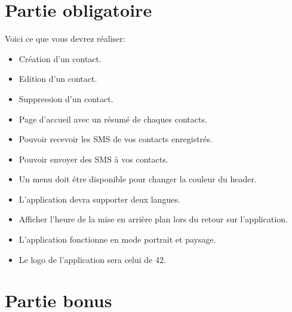\documentclass{42}
\begin{document}
\chapter{Partie obligatoire}
	
	Voici ce que vous devrez r\'ealiser:\\
	\vspace{5mm}
	\begin{itemize}\itemsep6pt
		\item Cr\'eation d'un contact.
		\item Edition d'un contact.
		\item Suppression d'un contact.
		\item Page d'accueil avec un r\'esum\'e de chaques contacts.
		\item Pouvoir recevoir les SMS de vos contacts enregistr\'es.
		\item Pouvoir envoyer des SMS \`a vos contacts.
		\item Un menu doit \'etre disponible pour changer la couleur du header.
		\item L'application devra supporter deux langues.
		\item Afficher l'heure de la mise en arri\`ere plan lors du retour sur
		l'application.
		\item L'application fonctionne en mode portrait et paysage.
		\item Le logo de l'application sera celui de 42.
	\end{itemize}

\chapter{Partie bonus}
\end{document}
